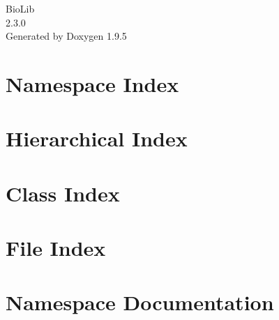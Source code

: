 \documentclass[twoside]{book}
\newcommand{\+}{\discretionary{\mbox{\scriptsize$\hookleftarrow$}}{}{}}
\newcommand{\clearemptydoublepage}{%
    \newpage{\pagestyle{empty}\cleardoublepage}%
  }
\begin{document}
  \raggedbottom
    \hypersetup{pageanchor=false,
                bookmarksnumbered=true,
                pdfencoding=unicode
               }
  \begin{titlepage}
  \vspace*{7cm}
  \begin{center}%
  {\Large Bio\+Lib}\\
  [1ex]\large 2.\+3.\+0 \\
  \vspace*{1cm}
  {\large Generated by Doxygen 1.9.5}\\
  \end{center}
  \end{titlepage}
  \clearemptydoublepage
  \tableofcontents
  \clearemptydoublepage
  \hypersetup{pageanchor=true}
\chapter{Namespace Index}

\chapter{Hierarchical Index}

\chapter{Class Index}

\chapter{File Index}

\chapter{Namespace Documentation}



\end{document}
